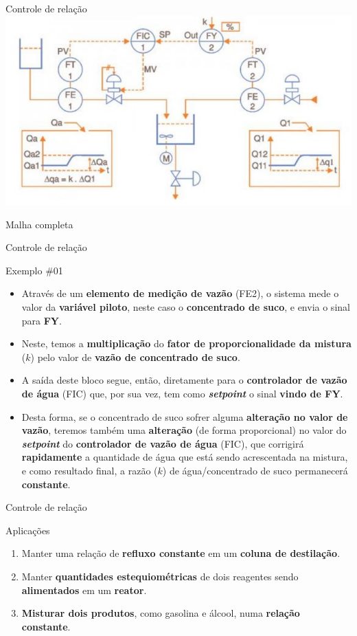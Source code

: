 \begin{frame}{Controle de relação}
	\centering
	\includegraphics[width=0.9\linewidth]{Figuras/Ch15/fig6}
	
	\bigskip
	
	Malha completa
\end{frame}


\begin{frame}{Controle de relação}
	\begin{block}{Exemplo \#01}
		\begin{itemize}
			\item Através de um \textbf{elemento de medição de vazão} (FE2), o sistema mede o valor da \textbf{variável piloto}, neste caso o \textbf{concentrado de suco}, e envia o sinal para \textbf{FY}.
			\item Neste, temos a \textbf{multiplicação} do \textbf{fator de proporcionalidade da mistura} ($ k $) pelo valor de \textbf{vazão de concentrado de suco}.
			\item A saída deste bloco segue, então, diretamente para o \textbf{controlador de vazão de água} (FIC) que, por sua vez, tem como \textbf{\textit{setpoint}} o sinal \textbf{vindo de FY}.
			\item Desta forma, se o concentrado de suco sofrer alguma \textbf{alteração no valor de vazão}, teremos também uma \textbf{alteração} (de forma proporcional) no valor do \textbf{\textit{setpoint}} do \textbf{controlador de vazão de água} (FIC), que corrigirá \textbf{rapidamente} a quantidade de água que está sendo acrescentada na mistura, e como resultado final, a razão ($ k $) de água/concentrado de suco permanecerá \textbf{constante}.
		\end{itemize}
	\end{block}
\end{frame}


\begin{frame}{Controle de relação}
	\begin{block}{Aplicações}
		\begin{enumerate}
			\item Manter uma relação de \textbf{refluxo constante} em um \textbf{coluna de destilação}.
			\item Manter \textbf{quantidades estequiométricas} de dois reagentes sendo \textbf{alimentados} em um \textbf{reator}.
			\item \textbf{Misturar dois produtos}, como gasolina e álcool, numa \textbf{relação constante}.
		\end{enumerate}
	\end{block}
\end{frame}


